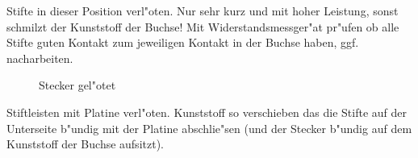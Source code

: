 \documentclass[ngerman,11pt,parskip=half] {scrartcl}
\begin{document}
Stifte in dieser Position verl"oten. Nur sehr kurz und mit hoher Leistung, sonst schmilzt der Kunststoff der Buchse! Mit Widerstandsmessger"at pr"ufen ob alle Stifte guten Kontakt zum jeweiligen Kontakt in der Buchse haben, ggf. nacharbeiten.


\begin{figure}[H]
\centering
{}
\hspace{1cm} %
\caption{Stecker gel"otet} \label{fig:1}
\end{figure}

Stiftleisten mit Platine verl"oten. Kunststoff so verschieben das die Stifte auf der Unterseite b"undig mit der Platine abschlie"sen (und der Stecker b"undig auf dem Kunststoff der Buchse aufsitzt). 
\end{document}
